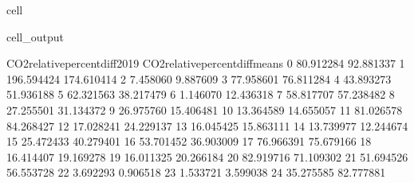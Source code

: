 \documentclass[letterpaper,10pt,english]{jupyterBook}
\begin{document}
\begin{sphinxuseclass}{cell}
\begin{sphinxVerbatimOutput}
\begin{sphinxuseclass}{cell_output}
\begin{sphinxVerbatim}[commandchars=\\\{\}]
    CO2\PYGZus{}relative\PYGZus{}percent\PYGZus{}diff\PYGZus{}2019  CO2\PYGZus{}relative\PYGZus{}percent\PYGZus{}diff\PYGZus{}means  \PYGZbs{}
0                       \PYGZhy{}80.912284                       \PYGZhy{}92.881337   
1                      \PYGZhy{}196.594424                      \PYGZhy{}174.610414   
2                        \PYGZhy{}7.458060                        \PYGZhy{}9.887609   
3                        77.958601                        76.811284   
4                        43.893273                        51.936188   
5                       \PYGZhy{}62.321563                       \PYGZhy{}38.217479   
6                         1.146070                        12.436318   
7                        58.817707                        57.238482   
8                        27.255501                        31.134372   
9                       \PYGZhy{}26.975760                       \PYGZhy{}15.406481   
10                       13.364589                        14.655057   
11                       81.026578                        84.268427   
12                       17.028241                        24.229137   
13                      \PYGZhy{}16.045425                       \PYGZhy{}15.863111   
14                       13.739977                        12.244674   
15                       25.472433                        40.279401   
16                      \PYGZhy{}53.701452                       \PYGZhy{}36.903009   
17                       76.966391                        75.679166   
18                      \PYGZhy{}16.414407                       \PYGZhy{}19.169278   
19                       16.011325                        20.266184   
20                      \PYGZhy{}82.919716                       \PYGZhy{}71.109302   
21                       51.694526                        56.553728   
22                        3.692293                        \PYGZhy{}0.906518   
23                       \PYGZhy{}1.533721                         3.599038   
24                      \PYGZhy{}35.275585                        82.777881   


\end{sphinxVerbatim}
\end{sphinxuseclass}
\end{sphinxVerbatimOutput}
\end{sphinxuseclass}
\end{document}
